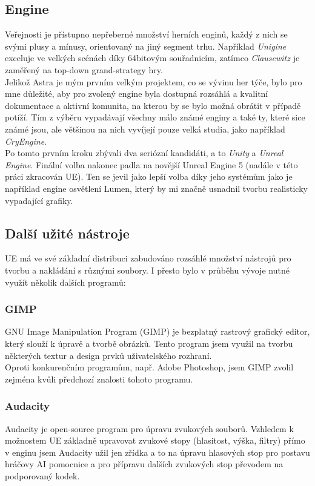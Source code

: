 \documentclass[12pt,a4paper,hidelinks]{article}
\begin{document}
\subsection{Engine}
Veřejnosti je přístupno nepřeberné množství herních enginů, každý z nich se svými plusy a mínusy, orientovaný na jiný segment trhu. Například \textit{Unigine} exceluje ve velkých scénách díky 64bitovým souřadnicím, zatímco \textit{Clausewitz} je zaměřený na top-down grand-strategy hry.\\
Jelikož Astra je mým prvním velkým projektem, co se vývinu her týče, bylo pro mne důležité, aby pro zvolený engine byla dostupná rozsáhlá a kvalitní dokumentace a aktivní komunita, na kterou by se bylo možná obrátit v případě potíží. Tím z výběru vypadávají všechny málo známé enginy a také ty, které sice známé jsou, ale většinou na nich vyvíjejí pouze velká studia, jako například \textit{CryEngine}.\\
Po tomto prvním kroku zbývali dva seriózní kandidáti, a to \textit{Unity} a \textit{Unreal Engine}. Finální volba nakonec padla na novější Unreal Engine 5 (nadále v této práci zkracován UE). Ten se jevil jako lepší volba díky jeho systémům jako je například engine osvětlení Lumen, který by mi značně usnadnil tvorbu realisticky vypadající grafiky.\\

\subsection{Další užité nástroje}
UE má ve své základní distribuci zabudováno rozsáhlé množství nástrojů pro tvorbu a nakládání s různými soubory. I přesto bylo v průběhu vývoje nutné využít několik dalších programů:\\
\subsubsection{GIMP}
GNU Image Manipulation Program (GIMP) je bezplatný rastrový grafický editor, který slouží k úpravě a tvorbě obrázků. Tento program jsem využil na tvorbu některých textur a design prvků uživatelského rozhraní.\\
Oproti konkurenčním programům, např. Adobe Photoshop, jsem GIMP zvolil zejména kvůli předchozí znalosti tohoto programu.\\
\subsubsection{Audacity}
Audacity je open-source program pro úpravu zvukových souborů. Vzhledem k možnostem UE základně upravovat zvukové stopy (hlasitost, výška, filtry) přímo v enginu jsem Audacity užil jen zřídka a to na úpravu hlasových stop pro postavu hráčovy AI pomocnice a pro přípravu dalších zvukových stop převodem na podporovaný kodek.\\
\end{document}
